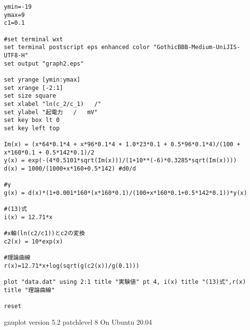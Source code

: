 \begin{lstlisting}[caption=graph2.gnuplot]
ymin=-19
ymax=9
c1=0.1

#set terminal wxt
set terminal postscript eps enhanced color "GothicBBB-Medium-UniJIS-UTF8-H"
set output "graph2.eps"

set yrange [ymin:ymax]
set xrange [-2:1]
set size square
set xlabel "ln(c_2/c_1)   /"
set ylabel "起電力   /   mV"
set key box lt 0
set key left top

Im(x) = (x*64*0.1*4 + x*96*0.1*4 + 1.0*23*0.1 + 0.5*96*0.1*4)/(100 + x*160*0.1 + 0.5*142*0.1)/2
y(x) = exp(-(4*0.5101*sqrt(Im(x)))/(1+10**(-6)*0.3285*sqrt(Im(x))))
d(x) = 1000/(1000+x*160+0.5*142) #d0/d

#γ
g(x) = d(x)*(1+0.001*160*(x*160*0.1)/(100+x*160*0.1+0.5*142*0.1))*y(x)

#(13)式
i(x) = 12.71*x

#x軸(ln(c2/c1))とc2の変換
c2(x) = 10*exp(x) 

#理論曲線
r(x)=12.71*x+log(sqrt(g(c2(x))/g(0.1))) 

plot "data.dat" using 2:1 title "実験値" pt 4, i(x) title "(13)式",r(x) title "理論曲線"

reset
\end{lstlisting}
gnuplot version 5.2 patchlevel 8 On Ubuntu 20.04
